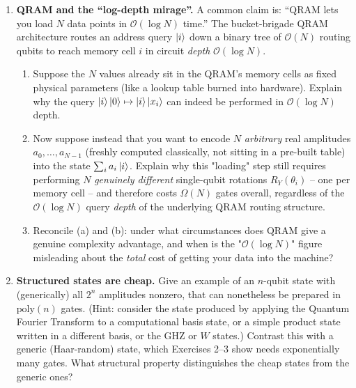 \documentclass[11pt]{article}
\begin{document}
\begin{enumerate}[label=\textbf{Exercise \arabic*.}, leftmargin=2.2cm]
\item \textbf{QRAM and the ``log-depth mirage''.}
A common claim is: ``QRAM lets you load $N$ data points in $\mathcal
O(\log N)$ time.'' The bucket-brigade QRAM architecture routes an
address query $\ket i$ down a binary tree of $\mathcal O(N)$ routing
qubits to reach memory cell $i$ in circuit \emph{depth} $\mathcal
O(\log N)$.
\begin{enumerate}[label=(\alph*)]
\item Suppose the $N$ values already sit in the QRAM's memory cells as
fixed physical parameters (like a lookup table burned into hardware).
Explain why the query
$\ket i\ket 0 \mapsto \ket i \ket{x_i}$
can indeed be performed in $\mathcal O(\log N)$ depth.
\item Now suppose instead that you want to encode $N$ \emph{arbitrary}
real amplitudes $a_0,\dots,a_{N-1}$ (freshly computed classically, not
sitting in a pre-built table) into the state $\sum_i a_i \ket i$.
Explain why this "loading" step still requires performing $N$
\emph{genuinely different} single-qubit rotations $R_Y(\theta_i)$ --
one per memory cell -- and therefore costs $\Omega(N)$ gates overall,
regardless of the $\mathcal O(\log N)$ query \emph{depth} of the
underlying QRAM routing structure.
\item Reconcile (a) and (b): under what circumstances does QRAM give a
genuine complexity advantage, and when is the "$\mathcal O(\log N)$"
figure misleading about the \emph{total} cost of getting your data into
the machine?
\end{enumerate}

%
%

\item \textbf{Structured states are cheap.}
Give an example of an $n$-qubit state with (generically) all $2^n$
amplitudes nonzero, that can nonetheless be prepared in $\mathrm{poly}(n)$
gates. (Hint: consider the state produced by applying the Quantum
Fourier Transform to a computational basis state, or a simple product
state written in a different basis, or the GHZ or $W$ states.) Contrast
this with a generic (Haar-random) state, which Exercises 2--3 show needs
exponentially many gates. What structural property distinguishes the
cheap states from the generic ones?

\end{enumerate}
\end{document}
